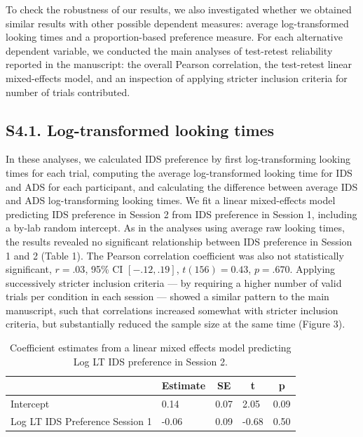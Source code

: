 \documentclass[
  man, donotrepeattitle,floatsintext]{apa6}
\begin{document}
To check the robustness of our results, we also investigated whether we obtained similar results with other possible dependent measures: average log-transformed looking times and a proportion-based preference measure. For each alternative dependent variable, we conducted the main analyses of test-retest reliability reported in the manuscript: the overall Pearson correlation, the test-retest linear mixed-effects model, and an inspection of applying stricter inclusion criteria for number of trials contributed.

\hypertarget{s4.1.-log-transformed-looking-times}{%
\subsection{S4.1. Log-transformed looking times}\label{s4.1.-log-transformed-looking-times}}

In these analyses, we calculated IDS preference by first log-transforming looking times for each trial, computing the average log-transformed looking time for IDS and ADS for each participant, and calculating the difference between average IDS and ADS log-transforming looking times.
We fit a linear mixed-effects model predicting IDS preference in Session 2 from IDS preference in Session 1, including a by-lab random intercept.
As in the analyses using average raw looking times, the results revealed no significant relationship between IDS preference in Session 1 and 2 (Table 1).
The Pearson correlation coefficient was also not statistically significant, \(r = .03\), 95\% CI \([-.12, .19]\), \(t(156) = 0.43\), \(p = .670\).
Applying successively stricter inclusion criteria --- by requiring a higher number of valid trials per condition in each session --- showed a similar pattern to the main manuscript, such that correlations increased somewhat with stricter inclusion criteria, but substantially reduced the sample size at the same time (Figure 3).

\begin{table}[tbp]

\begin{center}
\begin{threeparttable}

\caption{\label{tab:unnamed-chunk-7}Coefficient estimates from a linear mixed effects model predicting Log LT IDS preference in Session 2.}

\begin{tabular}{lllll}
\toprule
 & \multicolumn{1}{c}{Estimate} & \multicolumn{1}{c}{SE} & \multicolumn{1}{c}{t} & \multicolumn{1}{c}{p}\\
\midrule
Intercept & 0.14 & 0.07 & 2.05 & 0.09\\
Log LT IDS Preference Session 1 & -0.06 & 0.09 & -0.68 & 0.50\\
\bottomrule
\end{tabular}

\end{threeparttable}
\end{center}

\end{table}
\end{document}
